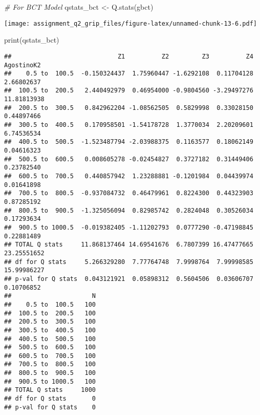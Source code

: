 \documentclass[
]{article}
\newenvironment{Shaded}{\begin{snugshade}}{\end{snugshade}}
\newcommand{\CommentTok}[1]{\textcolor[rgb]{0.56,0.35,0.01}{\textit{#1}}}
\newcommand{\FunctionTok}[1]{\textcolor[rgb]{0.00,0.00,0.00}{#1}}
\newcommand{\NormalTok}[1]{#1}
\newcommand{\OtherTok}[1]{\textcolor[rgb]{0.56,0.35,0.01}{#1}}
\begin{document}
\begin{Shaded}
\begin{Highlighting}[]
\CommentTok{\# For BCT Model}
\NormalTok{qstats\_bct }\OtherTok{\textless{}{-}} \FunctionTok{Q.stats}\NormalTok{(gbct)}
\end{Highlighting}
\end{Shaded}

\texttt{[image: assignment\_q2\_grip\_files/figure-latex/unnamed-chunk-13-6.pdf]}

\begin{Shaded}
\begin{Highlighting}[]
\FunctionTok{print}\NormalTok{(qstats\_bct)}
\end{Highlighting}
\end{Shaded}

\begin{verbatim}
##                             Z1          Z2         Z3          Z4  AgostinoK2
##    0.5 to  100.5  -0.150324437  1.75960447 -1.6292108  0.11704128  2.66802637
##  100.5 to  200.5   2.440492979  0.46954000 -0.9804560 -3.29497276 11.81813938
##  200.5 to  300.5   0.842962204 -1.08562505  0.5829998  0.33028150  0.44897466
##  300.5 to  400.5   0.170958501 -1.54178728  1.3770034  2.20209601  6.74536534
##  400.5 to  500.5  -1.523487794 -2.03988375  0.1163577  0.18062149  0.04616323
##  500.5 to  600.5   0.008605278 -0.02454827  0.3727182  0.31449406  0.23782540
##  600.5 to  700.5   0.440857942  1.23288881 -0.1201984  0.04439974  0.01641898
##  700.5 to  800.5  -0.937084732  0.46479961  0.8224300  0.44323903  0.87285192
##  800.5 to  900.5  -1.325056094  0.82985742  0.2824048  0.30526034  0.17293634
##  900.5 to 1000.5  -0.019382405 -1.11202793  0.0777290 -0.47198845  0.22881489
## TOTAL Q stats     11.868137464 14.69541676  6.7807399 16.47477665 23.25551652
## df for Q stats     5.266329280  7.77764748  7.9998764  7.99998585 15.99986227
## p-val for Q stats  0.043121921  0.05898312  0.5604506  0.03606707  0.10706852
##                      N
##    0.5 to  100.5   100
##  100.5 to  200.5   100
##  200.5 to  300.5   100
##  300.5 to  400.5   100
##  400.5 to  500.5   100
##  500.5 to  600.5   100
##  600.5 to  700.5   100
##  700.5 to  800.5   100
##  800.5 to  900.5   100
##  900.5 to 1000.5   100
## TOTAL Q stats     1000
## df for Q stats       0
## p-val for Q stats    0
\end{verbatim}
\end{document}
